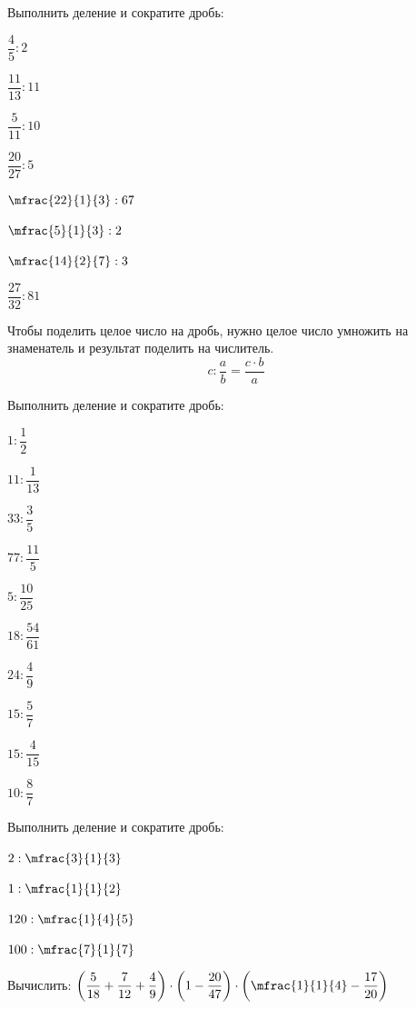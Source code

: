 \begin{class}[number=2]
\begin{definit}
		\end{definit}
	\begin{listofex}[resume]
		\item Выполнить деление и сократите дробь:
		\begin{enumcols}[itemcolumns=4]
			\item \( \dfrac{4}{5}:2 \)
			\item \( \dfrac{11}{13}:11 \)
			\item \( \dfrac{5}{11}:10 \)
			\item \( \dfrac{20}{27}:5 \)
			\item \( \mfrac{22}{1}{3}:67 \)
			\item \( \mfrac{5}{1}{3}:2 \)
			\item \( \mfrac{14}{2}{7}:3 \)
			\item \( \dfrac{27}{32}:81 \)
		\end{enumcols}
	\end{listofex}
		\begin{definit}
			Чтобы поделить целое число на дробь, нужно целое число умножить на знаменатель и результат поделить на числитель.
			\[ c:\dfrac{a}{b}=\dfrac{c\cdot b}{a} \]
		\end{definit}
	\begin{listofex}[resume]
			\item Выполнить деление и сократите дробь:
			\begin{enumcols}[itemcolumns=5]
				\item \( 1:\dfrac{1}{2} \)
				\item \( 11:\dfrac{1}{13} \)
				\item \( 33:\dfrac{3}{5} \)
				\item \( 77:\dfrac{11}{5} \)
				\item \( 5:\dfrac{10}{25} \)
				\item \( 18:\dfrac{54}{61} \)
				\item \( 24:\dfrac{4}{9} \)
				\item \( 15:\dfrac{5}{7} \)
				\item \( 15:\dfrac{4}{15} \)
				\item \( 10:\dfrac{8}{7} \)
			\end{enumcols}
			\item Выполнить деление и сократите дробь:
		\begin{enumcols}[itemcolumns=4]
			\item \( 2:\mfrac{3}{1}{3} \)
			\item \( 1:\mfrac{1}{1}{2} \)
			\item \( 120:\mfrac{1}{4}{5} \)
			\item \( 100:\mfrac{7}{1}{7} \)
		\end{enumcols}
	\item Вычислить: \( \left( \dfrac{5}{18}+\dfrac{7}{12}+\dfrac{4}{9} \right)\cdot\left( 1-\dfrac{20}{47} \right)\cdot\left( \mfrac{1}{1}{4}-\dfrac{17}{20} \right) \)
	\end{listofex}
	

\end{class}
